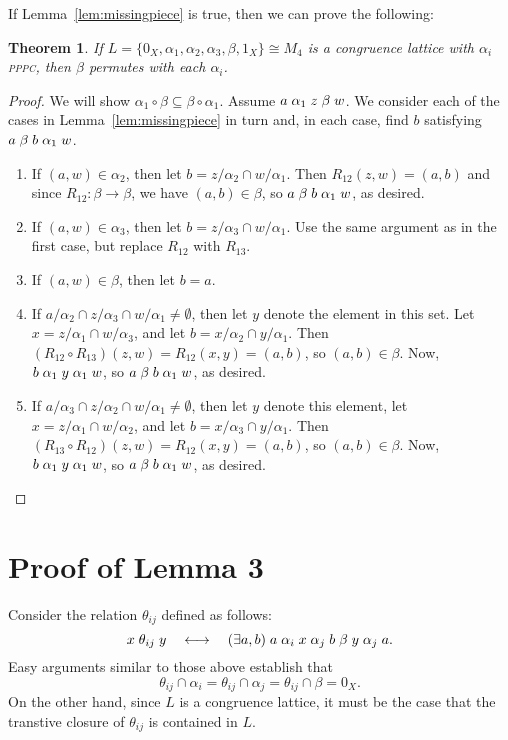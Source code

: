 \documentclass{amsart}
\theoremstyle{plain}
\newtheorem{theorem}{Theorem}
\theoremstyle{definition}
\theoremstyle{definition}
\numberwithin{equation}{section}
\newcommand{\<}{\ensuremath{\langle}}
\renewcommand{\>}{\ensuremath{\rangle}}
\newcommand{\rel}{\ensuremath{\mathrel}}
\newcommand{\PPPC}{\textsc{pppc}\xspace}
\begin{document}
If Lemma~\ref{lem:missingpiece} is true, then we can prove the following:
\begin{theorem}
If $L = \{0_X, \alpha_1, \alpha_2, \alpha_3, \beta, 1_X\} \cong  M_4$ is a
congruence lattice with $\alpha_i$ \PPPC, then $\beta$ permutes with each $\alpha_i$.
\end{theorem}
\begin{proof}
We will show $\alpha_1 \circ \beta \subseteq \beta \circ \alpha_1$.
Assume $a \rel{\alpha_1} z \rel{\beta} w$.  We consider each of the cases in
Lemma~\ref{lem:missingpiece} in turn and,
in each case, find $b$ satisfying $a \rel{\beta} b \rel{\alpha_1} w$.
\begin{enumerate}
\item If $(a,w) \in \alpha_2$, then let $b = z/\alpha_2 \cap w/\alpha_1$.  Then
$R_{12}(z,w) = (a,b)$ and since 
$R_{12}: \beta \rightarrow \beta$, we have $(a,b) \in \beta$, so 
$a \rel{\beta} b \rel{\alpha_1} w$, as desired.  
\item If $(a,w) \in \alpha_3$, then let $b = z/\alpha_3 \cap w/\alpha_1$. Use the same
argument as in the first case, but replace $R_{12}$ with $R_{13}$. 
\item If $(a,w) \in \beta$, then let $b = a$. 
\item If  $a/\alpha_2 \cap z/\alpha_3 \cap w/\alpha_1 \neq \emptyset$, then let
  $y$ denote the element in this set.  Let $x = z/\alpha_1 \cap w/\alpha_3$, and
  let $b = x/\alpha_2\cap y/\alpha_1$.  
  Then $(R_{12}\circ R_{13})(z,w) = R_{12}(x,y) = (a,b)$, so $(a,b) \in \beta$.
  Now, $b\rel{\alpha_1} y \rel{\alpha_1} w$, so
  $a \rel{\beta} b \rel{\alpha_1} w$, as desired.
\item If $a/\alpha_3 \cap z/\alpha_2 \cap w/\alpha_1 \neq \emptyset$, then let 
  $y$ denote this element, let $x = z/\alpha_1 \cap w/\alpha_2$, and
  let $b = x/\alpha_3\cap y/\alpha_1$.  
  Then $(R_{13}\circ R_{12})(z,w) = R_{12}(x,y) = (a,b)$, so $(a,b) \in \beta$.
  Now, $b\rel{\alpha_1} y \rel{\alpha_1} w$, so $a \rel{\beta} b \rel{\alpha_1} w$, as desired.
\end{enumerate}
\end{proof}

\section{Proof of Lemma 3}
Consider the relation $\theta_{ij}$ defined as follows:
\[
x \rel{\theta_{ij}} y \quad \longleftrightarrow \quad (\exists a, b) \;
a \rel{\alpha_i} x \rel{\alpha_j} b \rel{\beta} y \rel{\alpha_j} a.
\]
Easy arguments similar to those above establish that 
\[
\theta_{ij} \cap \alpha_i = \theta_{ij} \cap \alpha_j =
\theta_{ij} \cap \beta = 0_X.\]
On the other hand, since $L$ is a congruence lattice, it must be the case that
the transtive closure of $\theta_{ij}$ is contained in $L$.



\end{document}
